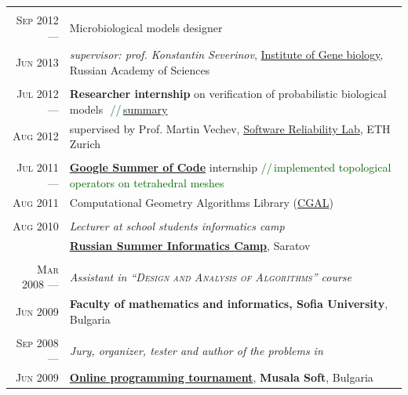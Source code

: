 \documentclass[a4paper,10pt]{article}
\def\myline{\color{linegray}\vline}
\newcommand{\minorcolor}[1]{\textcolor{mygray}{#1}}
\newcommand{\comment}[1]{\small\textcolor{darkgreen}{\,\,//\,#1}}
\newcommand{\mydate}[1]{\minorcolor{\textsc{#1}}}
\begin{document}
{\begin{tabular}{r!{\myline}p{14cm}}
        \\
	\mydate{Sep 2012 ---}      &  Microbiological models designer\\
        \mydate{Jun 2013}  &  \textit{supervisor: prof. Konstantin Severinov},  \href{http://www.genebiology.ru/}{Institute of Gene biology}, Russian Academy of Sciences\\
	
        \\
        \mydate{Jul 2012 ---}      &  \textbf{Researcher internship} on verification of probabilistic biological models \comment{\href{https://docs.google.com/document/d/1tNkXLaWY3ooA4MEnrbrL2_DOpOaiTlLoFblwzKFZdy0/edit?usp=sharing}{summary}}\\
        \mydate{Aug 2012} &  supervised by Prof. Martin Vechev, \href{http://www.srl.inf.ethz.ch/}{Software Reliability Lab}, ETH Zurich\\
	
        \\
        \mydate{Jul 2011 ---}      &  \textbf{\href{http://code.google.com/soc/}{Google Summer of Code}} internship\comment{implemented topological operators on tetrahedral meshes}\\
        \mydate{Aug 2011}         &  Computational Geometry Algorithms Library (\href{http://www.cgal.org/}{CGAL})\\
	
        \\
	\mydate{Aug 2010}         &  \textit{Lecturer at school students informatics camp}\\
	                          &  \textbf{\href{http://lksh.ru/}{Russian Summer Informatics Camp}}, Saratov\vspace{-5mm}\\
	
	\\
	\mydate{Mar 2008 ---}      &  \textit{Assistant in \textsc{``Design and Analysis of Algorithms''} course}\\
	\mydate{Jun 2009}        &  \textbf{Faculty of mathematics and informatics, Sofia University}, Bulgaria\\

	\\
	\mydate{Sep 2008 ---}     &  \textit{Jury, organizer, tester and \textit{author} of the problems in}\\
        \mydate{Jun 2009}        &  \textbf{\href{http://konkurs.musala.com/}{Online programming tournament}}, \textbf{Musala Soft}, Bulgaria\\


\end{tabular}}
\end{document}
